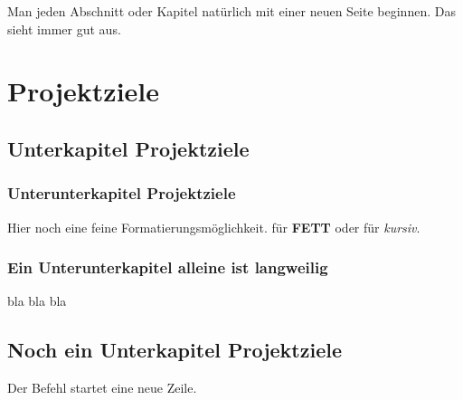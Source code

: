 \newpage
Man jeden Abschnitt oder Kapitel natürlich mit einer neuen Seite beginnen. Das sieht immer gut aus.

\section{Projektziele}
\subsection{Unterkapitel Projektziele}
\subsubsection{Unterunterkapitel Projektziele} 
Hier noch eine feine Formatierungsmöglichkeit.  für \textbf{FETT} oder  für \textit{kursiv}.
\subsubsection{Ein Unterunterkapitel alleine ist langweilig}
bla bla bla

\subsection{Noch ein Unterkapitel Projektziele}

Der Befehl  startet eine neue Zeile.
